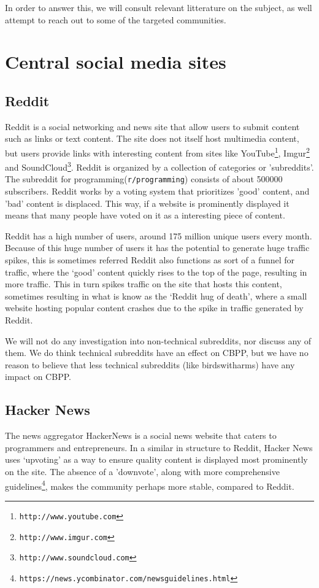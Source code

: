 \documentclass[a4paper,11pt]{article} %
\begin{document}
In order to answer this, we will consult relevant litterature on the subject, as well attempt to reach out
to some of the targeted communities. 


\section{Central social media sites}

\subsection{Reddit}

Reddit is a social networking and news site that allow users to submit content
such as links or text content. The site does not itself host multimedia content,
but users provide links with interesting content from sites like YouTube\footnote{\texttt{http://www.youtube.com}}, Imgur\footnote{\texttt{http://www.imgur.com}} and
SoundCloud\footnote{\texttt{http://www.soundcloud.com}}.
Reddit is organized by a collection of categories or 'subreddits'. 
The subreddit for programming(\texttt{r/programming}) consists of about \num{500000}
subscribers. %
Reddit works by a voting system that prioritizes 'good' content, and 'bad'
content is displaced. This way, if a website is prominently displayed it means that
many people have voted on it as a interesting piece of content.

Reddit has a high number of users, around 175 million
unique users every month. Because of this huge number of users it has 
the potential to generate huge traffic spikes, this is sometimes referred
Reddit also functions as sort of a funnel for traffic, where the ‘good’
content quickly rises to the top of the page, resulting in more
traffic. This in turn spikes traffic on the site that hosts this content,
sometimes resulting in what is know as the ‘Reddit hug of death’, where a
small website hosting popular content crashes due to the spike in traffic
generated by Reddit. %


We will not do any investigation into non-technical subreddits, nor discuss
any of them. We do think technical subreddits have an effect on CBPP, but we
have no reason to believe that less technical subreddits (like
birdswitharms) have any impact on CBPP.

\subsection{Hacker News}
The news aggregator HackerNews is a social news website that caters to
programmers and entrepreneurs. In a similar in structure to Reddit, Hacker
News uses ‘upvoting’ as a way to ensure quality content is displayed most
prominently on the site. The absence of a 'downvote', along with more
comprehensive guidelines\footnote{\texttt{https://news.ycombinator.com/newsguidelines.html}},
makes the community perhaps more stable, compared to Reddit.
\end{document}

